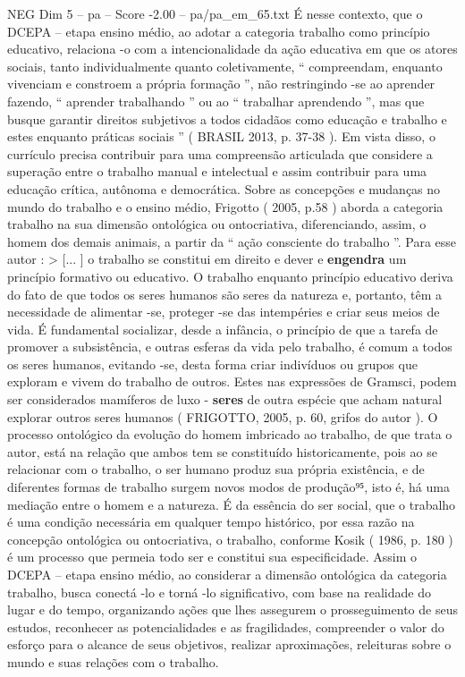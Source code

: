 \begin{textsample}{NEG Dim 5 – pa – Score -2.00 – pa/pa\_em\_65.txt}
É nesse contexto, que o DCEPA – etapa ensino médio, ao adotar a categoria trabalho como princípio educativo, relaciona -o com a intencionalidade da ação educativa em que os atores sociais, tanto individualmente quanto coletivamente, “ compreendam, enquanto vivenciam e constroem a própria formação ”, não restringindo -se ao aprender fazendo, “ aprender trabalhando ” ou ao “ trabalhar aprendendo ”, mas que busque garantir direitos subjetivos a todos cidadãos como educação e trabalho e estes enquanto práticas sociais ” ( BRASIL 2013, p. 37-38 ).
Em vista disso, o currículo precisa contribuir para uma compreensão articulada que considere a superação entre o trabalho manual e intelectual e assim contribuir para uma educação crítica, autônoma e democrática.
Sobre as concepções e mudanças no mundo do trabalho e o ensino médio, Frigotto ( 2005, p.58 ) aborda a categoria trabalho na sua dimensão ontológica ou ontocriativa, diferenciando, assim, o homem dos demais animais, a partir da “ ação consciente do trabalho ”.
Para esse autor : > [... ] o trabalho se constitui em direito e dever e \textbf{engendra} um princípio formativo ou educativo.
O trabalho enquanto princípio educativo deriva do fato de que todos os seres humanos são seres da natureza e, portanto, têm a necessidade de alimentar -se, proteger -se das intempéries e criar seus meios de vida.
É fundamental socializar, desde a infância, o princípio de que a tarefa de promover a subsistência, e outras esferas da vida pelo trabalho, é comum a todos os seres humanos, evitando -se, desta forma criar indivíduos ou grupos que exploram e vivem do trabalho de outros.
Estes nas expressões de Gramsci, podem ser considerados mamíferos de luxo - \textbf{seres} de outra espécie que acham natural explorar outros seres humanos ( FRIGOTTO, 2005, p. 60, grifos do autor ).
O processo ontológico da evolução do homem imbricado ao trabalho, de que trata o autor, está na relação que ambos tem se constituído historicamente, pois ao se relacionar com o trabalho, o ser humano produz sua própria existência, e de diferentes formas de trabalho surgem novos modos de produção⁹⁵, isto é, há uma mediação entre o homem e a natureza.
É da essência do ser social, que o trabalho é uma condição necessária em qualquer tempo histórico, por essa razão na concepção ontológica ou ontocriativa, o trabalho, conforme Kosik ( 1986, p. 180 ) é um processo que permeia todo ser e constitui sua especificidade.
Assim o DCEPA – etapa ensino médio, ao considerar a dimensão ontológica da categoria trabalho, busca conectá -lo e torná -lo significativo, com base na realidade do lugar e do tempo, organizando ações que lhes assegurem o prosseguimento de seus estudos, reconhecer as potencialidades e as fragilidades, compreender o valor do esforço para o alcance de seus objetivos, realizar aproximações, releituras sobre o mundo e suas relações com o trabalho.

\end{textsample}
